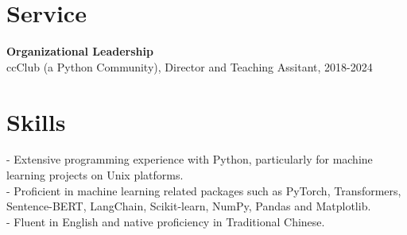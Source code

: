 \documentclass{article}
\begin{document}
\section{Service}
\noindent\textbf{Organizational Leadership}\\
ccClub (a Python Community), Director and Teaching Assitant, 2018-2024\\






\section{Skills}\noindent - Extensive programming experience with Python, particularly for machine learning projects on Unix platforms.\\ - Proficient in machine learning related packages such as PyTorch, Transformers, Sentence-BERT, LangChain, Scikit-learn, NumPy, Pandas and Matplotlib.\\ - Fluent in English and native proficiency in Traditional Chinese.




\end{document}
